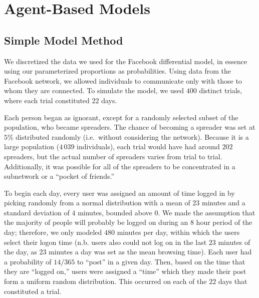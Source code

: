 \section{Agent-Based Models }
\label{sec:abmodel}

\subsection{Simple Model Method}
\label{subsec:abmodelsetup}

\noindent We discretized the data we used for the Facebook differential model,
in essence using our parameterized proportions as probabilities. Using data from
the Facebook network, we allowed individuals to communicate only with those to
whom they are connected. To simulate the model, we used $ 400 $ distinct trials,
where each trial constituted $ 22 $ days.

Each person began as ignorant, except for a randomly selected subset of the
population, who became spreaders. The chance of becoming a spreader was set at $
5\% $ distributed randomly (i.e.\ without considering the network). Because it is
a large population ($ 4\,039 $ individuals), each trial would have had around $
202 $ spreaders, but the actual number of spreaders varies from trial to trial.
Additionally,  it was possible for all of the spreaders to be concentrated in a
subnetwork or a ``pocket of friends.''

To begin each day, every user was assigned an amount of time logged in by
picking randomly from a normal distribution with a mean of $ 23 $ minutes and a
standard deviation of $ 4 $ minutes, bounded above $ 0 $. We made the assumption
that the majority of people will probably be logged on during an $8$ hour period
of the day; therefore, we only modeled $480$ minutes per day, within which the
users select their logon time (n.b. users also could not log on in the last $ 23 $
minutes of the day, as $ 23 $ minutes a day was set as the mean browsing time).
Each user had a probability of $14/365$ to ``post'' in a given day. Then, based
on the time that they are ``logged on,'' users were assigned a ``time'' which they
made their post form a uniform random distribution. This occurred on each of the $
22 $ days that constituted a trial.

